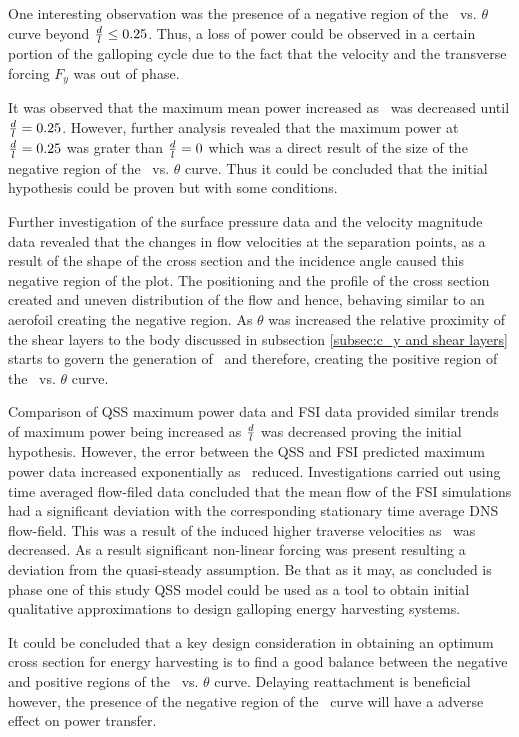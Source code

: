  One interesting observation was the presence of a negative region of the \cy\ vs. $\theta$ curve beyond $\frac{d}{l}\leq0.25$. Thus, a loss of power could be observed in a certain portion of the galloping cycle  due to the fact that the velocity and the transverse forcing $F_{y}$ was out of phase. 
 
 It was observed that the maximum mean power increased as \ratio\ was decreased until $\frac{d}{l}=0.25$. However, further analysis revealed that the maximum power at $\frac{d}{l}=0.25$ was grater than $\frac{d}{l}=0$ which was a direct result of the size of the negative region of the \cy\ vs. $\theta$ curve. Thus it could be concluded that the initial hypothesis could be proven but with some conditions.  
 
 Further investigation of the surface pressure data and the velocity magnitude data revealed that the changes in flow velocities at the separation points, as a result of the shape of the cross section and the incidence angle caused this negative region of the \cy plot. The positioning and the profile of the cross section created and uneven distribution of the flow and hence, behaving similar to an aerofoil creating the negative region. As $\theta$ was increased the relative proximity of the shear layers to the body  discussed in subsection \ref{subsec:c_y and shear layers} starts to govern the generation of \cy\ and therefore, creating the positive region of the \cy\ vs. $\theta$ curve.    
 
 Comparison of QSS maximum power data and FSI data provided similar trends of maximum power being increased as $\frac{d}{l}$ was decreased proving the initial hypothesis. However, the error between the QSS and FSI predicted maximum power data increased exponentially as \ratio\ reduced. Investigations carried out using time averaged flow-filed data concluded that the mean flow of the FSI simulations had a significant deviation with the corresponding stationary time average DNS flow-field. This was a result of the induced higher  traverse velocities as \ratio\ was decreased. As a result significant non-linear forcing was present resulting a deviation from the quasi-steady assumption. Be that as it may, as concluded is phase one of this study QSS model could be used as a tool to obtain initial qualitative approximations to design galloping energy harvesting systems. 
 
 It could be concluded that a key design consideration in obtaining an optimum cross section for energy harvesting is to find a good balance between the negative and positive regions of the \cy\ vs. $\theta$ curve. Delaying reattachment is beneficial however, the presence of the negative region of the \cy\ curve will have a adverse effect on power transfer. 
 
